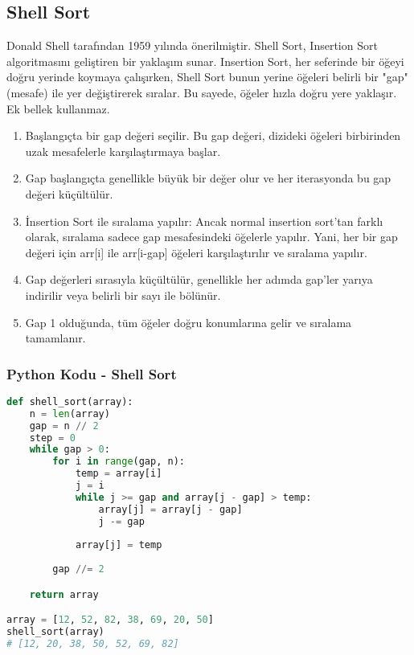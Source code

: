\newpage

\subsection{Shell Sort}

Donald Shell tarafından 1959 yılında önerilmiştir. Shell Sort, Insertion Sort algoritmasını geliştiren bir yaklaşım sunar. Insertion Sort, her seferinde bir öğeyi doğru yerinde koymaya çalışırken, Shell Sort bunun yerine öğeleri belirli bir "gap" (mesafe) ile yer değiştirerek sıralar. Bu sayede, öğeler hızla doğru yere yaklaşır. Ek bellek kullanmaz.

\begin{enumerate}
    \item Başlangıçta bir gap değeri seçilir. Bu gap değeri, dizideki öğeleri birbirinden uzak mesafelerle karşılaştırmaya başlar.
    \item Gap başlangıçta genellikle büyük bir değer olur ve her iterasyonda bu gap değeri küçültülür.
    \item İnsertion Sort ile sıralama yapılır: Ancak normal insertion sort’tan farklı olarak, sıralama sadece gap mesafesindeki öğelerle yapılır. Yani, her bir gap değeri için arr[i] ile arr[i-gap] öğeleri karşılaştırılır ve sıralama yapılır.
    \item Gap değerleri sırasıyla küçültülür, genellikle her adımda gap'ler yarıya indirilir veya belirli bir sayı ile bölünür.
    \item Gap 1 olduğunda, tüm öğeler doğru konumlarına gelir ve sıralama tamamlanır.
\end{enumerate}

\subsubsection{Python Kodu - Shell Sort}

\begin{lstlisting}[language=Python]
def shell_sort(array):
    n = len(array)
    gap = n // 2
    step = 0
    while gap > 0:
        for i in range(gap, n):
            temp = array[i]
            j = i
            while j >= gap and array[j - gap] > temp:
                array[j] = array[j - gap]
                j -= gap
                
            array[j] = temp
        
        gap //= 2 

    return array

array = [12, 52, 82, 38, 69, 20, 50]
shell_sort(array)
# [12, 20, 38, 50, 52, 69, 82]
\end{lstlisting}

